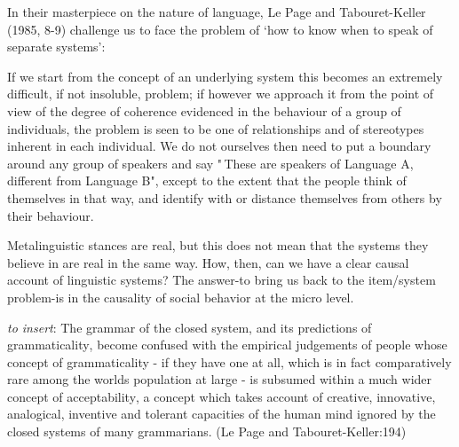 In their masterpiece on the nature of language, Le Page and 
Tabouret-Keller (1985, 8-9) challenge us to face the problem of \textquoteleft how to 
know when to speak of separate systems': 



If we start from the concept of an underlying system this becomes an 
extremely difficult, if not insoluble, problem; if however we approach 
it from the point of view of the degree of coherence evidenced in the 
behaviour of a group of individuals, the problem is seen to be one of 
relationships and of stereotypes inherent in each individual. We do not 
ourselves then need to put a boundary around any group of speakers and 
say "\,These are speakers of Language A, different from Language B", 
except to the extent that the people think of themselves in that way, 
and identify with or distance themselves from others by their behaviour. 




Metalinguistic stances are real, but this does not mean that the systems 
they believe in are real in the same way. How, then, can we have a clear 
causal account of linguistic systems? The answer-to bring us back to the 
item/system problem-is in the causality of social behavior at the micro 
level.



\textit{to insert}: The grammar of the closed system, and its predictions of grammaticality, become confused with the empirical judgements of people whose concept of grammaticality - if they have one at all, which is in fact comparatively rare among the worlds population at large - is subsumed within a much wider concept of acceptability, a concept which takes account of creative, innovative, analogical, inventive and tolerant capacities of the human mind ignored by the closed systems of many grammarians. (Le Page and Tabouret-Keller:194)


